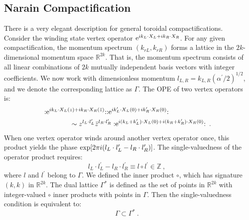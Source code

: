 \subsection*{Narain Compactification}
There is a very elegant description for general toroidal compactifications. Consider the winding state vertex operator $\mathrm{e}^{i k_{L} \cdot X_{L}+i k_{R} \cdot X_{R}}$. 
For any given compactification, the momentum spectrum $(k_{r L}, k_{r R})$ forms a lattice in the $2 k$-dimensional momentum space $\mathds{R}^{2 k}$. 
That is, the momentum spectrum consists of all linear combinations of $2 k$ mutually independent basis vectors with integer coefficients. 
We now work with dimensionless momentum $l_{L, R}=k_{L, R}(\alpha^{\prime}/2)^{1 / 2}$, 
and we denote the corresponding lattice as $\Gamma $. The OPE of two vertex operators is:
\begin{align}
	&:\mathrel{\mathrm{e}^{i k_{L} \cdot X_{L}(z)+i k_{R} \cdot X_{R}(\bar{z})} }: 
	:\mathrel{\mathrm{e}^{i k_{L}^{\prime} \cdot X_{L}(0)+i k_{R}^{\prime} \cdot X_{R}(0)}}: \nonumber \\
	&\qquad \qquad \sim z^{l_{L} \cdot l_{L}^{\prime}} \bar{z}^{l_{R} \cdot l_{R}^{\prime}}
	:\mathrel{ \mathrm{e}^{i(k_{L}+k_{L}^{\prime}) \cdot X_{L}(0)+i(k_{R}+k_{R}^{\prime}) \cdot X_{R}(0)} }: \:. \label{8.4.16}
\end{align}
When one vertex operator winds around another vertex operator once, this product yields the phase $\exp[2 \pi i(l_{L} \cdot l_{L}^{\prime}-l_{R} \cdot l_{R}^{\prime})]$. 
The single-valuedness of the operator product requires:
\begin{equation}
	l_{L} \cdot l_{L}^{\prime}-l_{R} \cdot l_{R}^{\prime} \equiv l \vysmwhtcircle l^{\prime} \in \mathds{Z} \:, \label{8.4.17}
\end{equation}
where $l$ and $l^{\prime}$ belong to $\Gamma$. 
We defined the inner product $\vysmwhtcircle$, which has signature $(k, k)$ in $\mathds{R}^{2 k} $. 
The dual lattice $\Gamma^{*}$ is defined as the set of points in $\mathds{R}^{2 k}$ with integer-valued $\vysmwhtcircle$ inner products with points in $\Gamma$. Then the single-valuedness condition is equivalent to:
\begin{equation}
	\Gamma \subset \Gamma^{*} \:. \label{8.4.18}
\end{equation}

